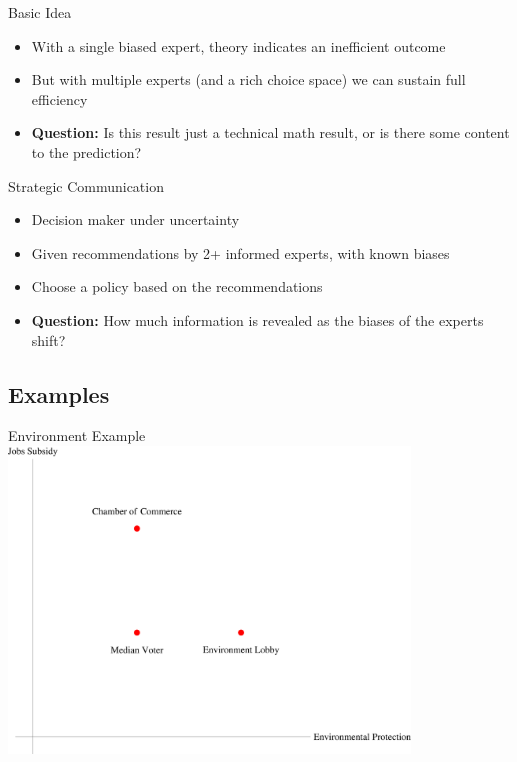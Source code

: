 \documentclass{beamer}
\begin{document}
\begin{frame}{Basic Idea}
	\begin{itemize}
		\item With a single biased expert, theory indicates an inefficient outcome
		\item But with multiple experts (and a rich choice space) we can sustain full efficiency
		\item \textbf{Question:} Is this result just a technical math result, or is there some content to the prediction?
	\end{itemize}
\end{frame}
\begin{frame}{Strategic Communication}
	\begin{itemize}
		\item Decision maker under uncertainty 
		\item Given recommendations by 2+ informed experts, with known biases
		\item Choose a policy based on the recommendations 
		\item \textbf{Question:} How much information is revealed as the biases of the experts shift?
	\end{itemize}
\end{frame}

\subsection{Examples}
\begin{frame}{Environment Example}
	\centering \includegraphics[width=0.8\textwidth]{./i/ExpertsEnvironment.eps}
\end{frame}
\end{document}
